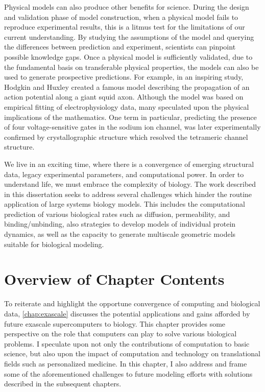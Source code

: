 \par Physical models can also produce other benefits for science.
During the design and validation phase of model construction, when a physical model fails to reproduce experimental results, this is a litmus test for the limitations of our current understanding.
By studying the assumptions of the model and querying the differences between prediction and experiment, scientists can pinpoint possible knowledge gaps.
Once a physical model is sufficiently validated, due to the fundamental basis on transferable physical properties, the models can also be used to generate prospective predictions.
For example, in an inspiring study, Hodgkin and Huxley created a famous model describing the propagation of an action potential along a giant squid axon\cite{HUXLEY1952}.
Although the model was based on empirical fitting of electrophysiology data, many speculated upon the physical implications of the mathematics.
One term in particular, predicting the presence of four voltage-sensitive gates in the sodium ion channel, was later experimentally confirmed by crystallographic structure which resolved the tetrameric channel structure\cite{Sigg2014a}.

\par We live in an exciting time, where there is a convergence of emerging structural data, legacy experimental parameters, and computational power.
In order to understand life, we must embrace the complexity of biology.
The work described in this dissertation seeks to address several challenges which hinder the routine application of large systems biology models.
This includes the computational prediction of various biological rates such as diffusion, permeability, and binding/unbinding, also strategies to develop models of individual protein dynamics, as well as the capacity to generate multiscale geometric models suitable for biological modeling.

\section{Overview of Chapter Contents}

\par To reiterate and highlight the opportune convergence of computing and biological data, \cref{chap:exascale} discusses the potential applications and gains afforded by future exascale supercomputers to biology.
This chapter provides some perspective on the role that computers can play to solve various biological problems.
I speculate upon not only the contributions of computation to basic science, but also upon the impact of computation and technology on translational fields such as personalized medicine.
In this chapter, I also address and frame some of the aforementioned challenges to future modeling efforts with solutions described in the subsequent chapters.

